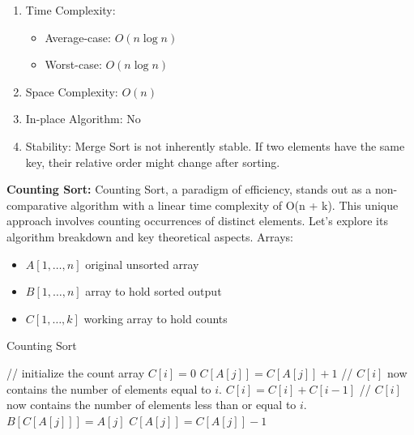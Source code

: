 \documentclass[12pt,twocolumn]{article}
\begin{document}
\begin{enumerate}
  \item Time Complexity:
  \begin{itemize}
    \item Average-case: \( O(n \log n) \)
    \item Worst-case: \( O(n \log n) \)
  \end{itemize}
  
  \item Space Complexity: \( O(n) \)
  
  \item In-place Algorithm: No
  
  \item Stability: Merge Sort is not inherently stable. If two elements have the same key, their relative order might change after sorting.
\end{enumerate}

\textbf{Counting Sort:}
Counting Sort, a paradigm of efficiency, stands out as a non-comparative algorithm with a linear time complexity of O(n + k). This unique approach involves counting occurrences of distinct elements. Let's explore its algorithm breakdown and key theoretical aspects.
\cite{geeksforgeeks-counting-sort}
Arrays:
\begin{itemize}
    \item \( A[1, \ldots, n] \) original unsorted array
    \item \( B[1, \ldots, n] \) array to hold sorted output
    \item \( C[1, \ldots, k] \) working array to hold counts
\end{itemize}

\begin{algorithm}[H]
\caption{Counting Sort}\label{alg:counting_sort}
\begin{algorithmic}[1]
    \State // initialize the count array
        \State $C[i] = 0$
    \EndFor
        \State $C[A[j]] = C[A[j]] + 1$
    \EndFor
    \State // $C[i]$ now contains the number of elements equal to $i$.
        \State $C[i] = C[i] + C[i - 1]$
    \EndFor
    \State // $C[i]$ now contains the number of elements less than or equal to $i$.
        \State $B[C[A[j]]] = A[j]$
        \State $C[A[j]] = C[A[j]] - 1$
    \EndFor
\EndProcedure
\end{algorithmic}
\end{algorithm}
\end{document}
